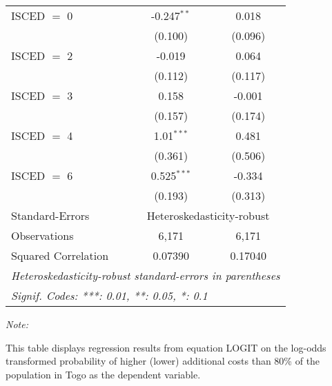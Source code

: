 \begin{table}[htbp!]
\begin{adjustbox}{width = 1\textwidth, max height = 0.95\textheight, center}
\begin{threeparttable}[b]
\begin{tabular}{lcc}
            ISCED $=$ 0          & -0.247$^{**}$  & 0.018\\   
                                 & (0.100)        & (0.096)\\   
            ISCED $=$ 2          & -0.019         & 0.064\\   
                                 & (0.112)        & (0.117)\\   
            ISCED $=$ 3          & 0.158          & -0.001\\   
                                 & (0.157)        & (0.174)\\   
            ISCED $=$ 4          & 1.01$^{***}$   & 0.481\\   
                                 & (0.361)        & (0.506)\\   
            ISCED $=$ 6          & 0.525$^{***}$  & -0.334\\   
                                 & (0.193)        & (0.313)\\   
            \midrule 
            Standard-Errors & \multicolumn{2}{c}{Heteroskedasticity-robust} \\ 
            Observations         & 6,171          & 6,171\\  
            Squared Correlation  & 0.07390        & 0.17040\\  
            \midrule \midrule
            \multicolumn{3}{l}{\emph{Heteroskedasticity-robust standard-errors in parentheses}}\\
            \multicolumn{3}{l}{\emph{Signif. Codes: ***: 0.01, **: 0.05, *: 0.1}}\\
         \end{tabular}
         
         \begin{tablenotes}\item \medskip \textit{Note:}
            \item This table displays regression results from equation LOGIT on the log-odds transformed probability of higher (lower) additional costs than 80\% of the population in Togo as the dependent variable. 
         \end{tablenotes}
      \end{threeparttable}
   \end{adjustbox}
\end{table}


